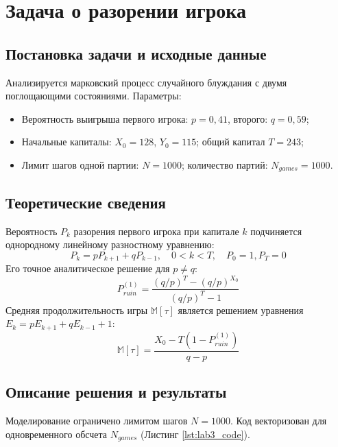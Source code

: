 \documentclass[a4paper,14pt]{extarticle}
\begin{document}
\section{Задача о разорении игрока}

\subsection{Постановка задачи и исходные данные}
Анализируется марковский процесс случайного блуждания с двумя поглощающими состояниями. Параметры:
\begin{itemize}
    \item Вероятность выигрыша первого игрока: $p = 0,41$, второго: $q = 0,59$;
    \item Начальные капиталы: $X_0 = 128$, $Y_0 = 115$; общий капитал $T = 243$;
    \item Лимит шагов одной партии: $N = 1000$; количество партий: $N_{games} = 1000$.
\end{itemize}

\subsection{Теоретические сведения}
Вероятность $P_k$ разорения первого игрока при капитале $k$ подчиняется однородному линейному разностному уравнению:
\begin{equation}
    P_k = p P_{k+1} + q P_{k-1}, \quad 0 < k < T, \quad P_0 = 1, P_T = 0
\end{equation}
Его точное аналитическое решение для $p \neq q$:
\begin{equation}
    P_{ruin}^{(1)} = \frac{(q/p)^T - (q/p)^{X_0}}{(q/p)^T - 1}
\end{equation}
Средняя продолжительность игры $\mathbb{M}[\tau]$ является решением уравнения $E_k = p E_{k+1} + q E_{k-1} + 1$:
\begin{equation}
    \mathbb{M}[\tau] = \frac{X_0 - T(1 - P_{ruin}^{(1)})}{q - p}
\end{equation}

\subsection{Описание решения и результаты}
Моделирование ограничено лимитом шагов $N=1000$. Код векторизован для одновременного обсчета $N_{games}$ (Листинг \ref{lst:lab3_code}).
\end{document}
